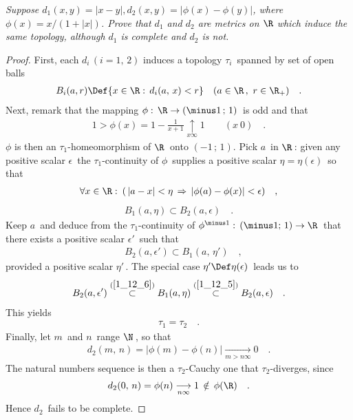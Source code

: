 \textit{
Suppose %
%
  $d_{1}(x,y)=|x-y|, d_{2}(x,y)=|\phi(x)-\phi(y)|$, %
%
where %
%
  $\phi(x)={x}/{(1+\lvert x \rvert )}$. %
%
Prove that $d_{1}$ and $d_{2}$ are metrics on $\R$ which induce %
the same topology, although $d_{1}$ is complete and $d_{2}$ is not.
}
\begin{proof}First, each $d_i\, (i=1,\,2)$ induces a topology $\tau_i\,$ spanned by set of open balls 
\begin{align}\label{1_12_2}
B_i(a,r)\Def \{ x\in \R:\, d_i (a,\,x) < r\} \quad (a\in \R\,,\, \, r\in \R_+ )\quad . \end{align}
Next, remark that the mapping $\phi:\,  \R\to (\minus 1\, ;\,1)\,$ is odd and that
\begin{align}\label{1_12_1}
1> \phi(x)=1-\frac{1}{x+1} \underset{x\infty}{\uparrow} 1 \quad \quad (x\> 0) \quad.
\end{align}
$\phi$ is then an $\tau_1$-homeomorphism of $\R\,$ onto $(\minus 1\,;\, 1)$. Pick $a\,$ in $\R\,$: given any positive scalar $\epsilon\,$ the $\tau_1$-continuity of $\phi\,$ supplies a positive scalar $\eta=\eta(\epsilon)\,$ so that 
\begin{align}
\forall x \in\R:\: (\, |a-x|< \eta \,\Rightarrow\, |\phi(a)-\phi(x)|< \epsilon)\quad , \end{align}
\ie
\begin{align}\label{1_12_5}
B_1(a,\eta)\subset B_2(a,\epsilon)\quad  .\end{align}
Keep $a\,$ and deduce from the $\tau_1$-continuity of $\phi^{\minus 1}:\, (\minus 1;\, 1)\to \R\,$ that there exists a positive scalar $\epsilon'\,$ such that 
\begin{align} \label{1_12_6}
\quad B_{2}(a,\epsilon')\subset B_{1}(a,\,\eta')  \quad  ,\end{align}
provided a positive scalar $\eta'\,$. The special case $\eta' \Def \eta(\epsilon)\,$ leads us to 
\begin{align}
B_{2}(a,\epsilon')\overset{(\ref{1_12_6})}{\subset} B_{1}(a,\eta ) \overset{(\ref{1_12_5})}{\subset} B_2(a,\epsilon)\quad . \end{align}
This yields
\begin{align}\tau_1=\tau_2 \quad . \end{align}
Finally, let $m\,$ and $n\,$ range $\N\,$, so that
\begin{align}
\quad d_{2}(m,\,n)=|\phi(m)-\phi(n)| {\underset{m> n \infty}{\longrightarrow}}0\quad .
\quad \end{align}
The natural numbers sequence is then a $\tau_2$-Cauchy one that $\tau_2$-diverges, since
\begin{align}
d_{2}(0,\,n) = \phi (n) \underset{n\infty}{\longrightarrow}1 \, \notin \, \phi(\R) \quad .\end{align}
Hence $d_2\,$ fails to be complete.
\end{proof}